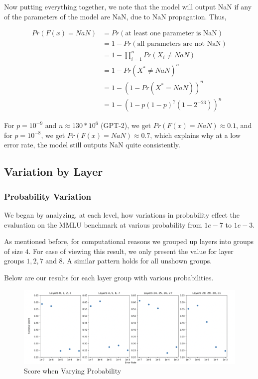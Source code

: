 Now putting everything together, we note that the model will output NaN if any of the parameters of the model are NaN, due to NaN propagation. Thus,

\begin{align*}
	Pr(F(x) = NaN) &= Pr(\text{at least one parameter is NaN}) \\
	&= 1 - Pr(\text{all parameters are not NaN}) \\
	&= 1 - \prod_{i=1}^n Pr(X_i \neq NaN) \\
	&= 1 - Pr(X^* \neq NaN)^n \\
	&= 1 - (1 - Pr(X^* = NaN))^n \\
	&= 1 - (1 - p(1 - p)^7(1 - 2^{-23}))^n
\end{align*}

For $p = 10^{-9}$ and $n \approx 130 * 10^6$ (GPT-2), we get $Pr(F(x) = NaN) \approx 0.1$, and for $p = 10^{-8}$, we get $Pr(F(x) = NaN) \approx 0.7$, which explains why at a low error rate, the model still outputs NaN quite consistently.

\subsection{Variation by Layer}

\subsubsection{Probability Variation}
We began by analyzing, at each level, how variations in probability effect the evaluation on the MMLU benchmark at various probability from $1e-7$ to $1e-3$.

As mentioned before, for computational reasons we grouped up layers into groups of size $4$. For ease of viewing this result, we only present the value for layer groups $1, 2, 7$ and $8$. A similar pattern
holds for all unshown groups.

Below are our results for each layer group with various probabilities.

\begin{figure}[!htbp]
    \centering
    \includegraphics[width=1.0\linewidth]{images/varyprob.png}
    \caption{Score when Varying Probability}
    \label{fig:varyprob}
\end{figure}

